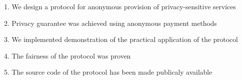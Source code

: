\documentclass[preprint,3p]{elsarticle}
\begin{document}
\begin{titlepage}
   \begin{center}
       \vspace*{1cm}

       \begin{enumerate}
        \item We design a protocol for anonymous provision of privacy-sensitive services
        \item Privacy guarantee was achieved using anonymous payment methods
        \item We implemented demonstration of the practical application of the protocol
        \item The fairness of the protocol was proven
        \item The source code of the protocol has been made publicaly available
       \end{enumerate}
       
            
   \end{center}
\end{titlepage}
\end{document}

